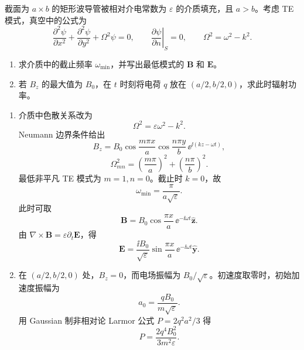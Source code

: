\begin{question}[填充介质的矩形波导]
截面为 $a\times b$ 的矩形波导管被相对介电常数为 $\varepsilon$ 的介质填充，且 $a>b$。考虑 TE 模式，真空中的公式为
\[
  \frac{\partial^2\psi}{\partial x^2}+\frac{\partial^2\psi}{\partial y^2}+\Omega^2\psi=0,
  \qquad
  \left.\frac{\partial\psi}{\partial n}\right|_S=0,
  \qquad
  \Omega^2=\omega^2-k^2 .
\]
\begin{enumerate}
  \item 求介质中的截止频率 $\omega_{\min}$，并写出最低模式的 $\mathbf B$ 和 $\mathbf E$。
  \item 若 $B_z$ 的最大值为 $B_0$，在 $t$ 时刻将电荷 $q$ 放在 $(a/2,b/2,0)$，求此时辐射功率。
\end{enumerate}
\begin{solution}
\begin{enumerate}
  \item 介质中色散关系改为
  \[
    \Omega^2=\varepsilon\omega^2-k^2 .
  \]
  Neumann 边界条件给出
  \[
    B_z=B_0\cos\frac{m\pi x}{a}\cos\frac{n\pi y}{b}\,
    \ee^{\ii(kz-\omega t)},
  \]
  \[
    \Omega_{mn}^2=\left(\frac{m\pi}{a}\right)^2+
    \left(\frac{n\pi}{b}\right)^2 .
  \]
  最低非平凡 TE 模式为 $m=1,n=0$。截止时 $k=0$，故
  \[
    \boxed{\omega_{\min}=\frac{\pi}{a\sqrt\varepsilon}} .
  \]
  此时可取
  \[
    \mathbf B=B_0\cos\frac{\pi x}{a}\,\ee^{-\ii\omega t}\hat{\mathbf z} .
  \]
  由 $\nabla\times\mathbf B=\varepsilon\partial_t\mathbf E$，得
  \[
    \mathbf E=\frac{\ii B_0}{\sqrt\varepsilon}
    \sin\frac{\pi x}{a}\,\ee^{-\ii\omega t}\hat{\mathbf y} .
  \]

  \item 在 $(a/2,b/2,0)$ 处，$B_z=0$，而电场振幅为 $B_0/\sqrt\varepsilon$。初速度取零时，初始加速度振幅为
  \[
    a_0=\frac{qB_0}{m\sqrt\varepsilon} .
  \]
  用 Gaussian 制非相对论 Larmor 公式 $P=2q^2a^2/3$ 得
  \[
    \boxed{P=\frac{2q^4B_0^2}{3m^2\varepsilon}} .
  \]
\end{enumerate}
\end{solution}
\end{question}

